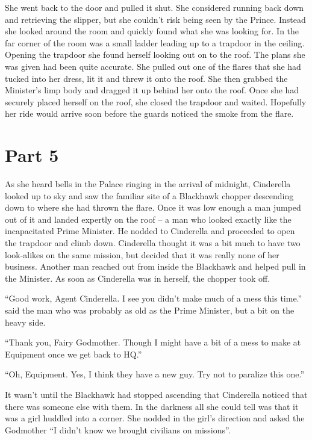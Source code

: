 \documentclass[11pt,letterpaper]{article}
\begin{document}
She went back to the door and pulled it shut. She considered running back down and retrieving the slipper, but she couldn't risk being seen by the Prince. Instead she looked around the room and quickly found what she was looking for. In the far corner of the room was a small ladder leading up to a trapdoor in the ceiling. Opening the trapdoor she found herself looking out on to the roof. The plans she was given had been quite accurate. She pulled out one of the flares that she had tucked into her dress, lit it and threw it onto the roof. She then grabbed the Minister's limp body and dragged it up behind her onto the roof. Once she had securely placed herself on the roof, she closed the trapdoor and waited. Hopefully her ride would arrive soon before the guards noticed the smoke from the flare.

\section*{Part 5}

As she heard bells in the Palace ringing in the arrival of midnight, Cinderella looked up to sky and saw the familiar site of a Blackhawk chopper descending down to where she had thrown the flare. Once it was low enough a man jumped out of it and landed expertly on the roof -- a man who looked exactly like the incapacitated Prime Minister. He nodded to Cinderella and proceeded to open the trapdoor and climb down. Cinderella thought it was a bit much to have two look-alikes on the same mission, but decided that it was really none of her business. Another man reached out from inside the Blackhawk and helped pull in the Minister. As soon as Cinderella was in herself, the chopper took off.

``Good work, Agent Cinderella. I see you didn't make much of a mess this time.'' said the man who was probably as old as the Prime Minister, but a bit on the heavy side.

``Thank you, Fairy Godmother. Though I might have a bit of a mess to make at Equipment once we get back to HQ.''

``Oh, Equipment. Yes, I think they have a new guy. Try not to paralize this one.''

It wasn't until the Blackhawk had stopped ascending that Cinderella noticed that there was someone else with them. In the darkness all she could tell was that it was a girl huddled into a corner. She nodded in the girl's direction and asked the Godmother ``I didn't know we brought civilians on missions''.
\end{document}
